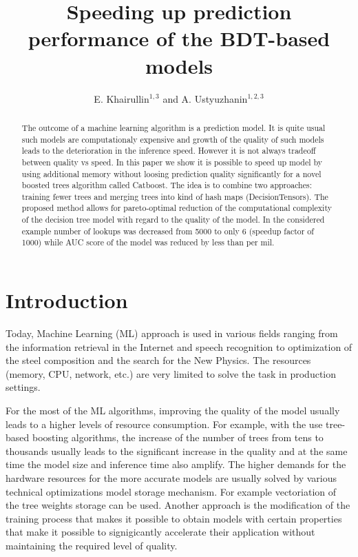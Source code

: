 \documentclass[a4paper]{jpconf}
\begin{document}
\title{Speeding up prediction performance of the BDT-based models}

\author{
 E. Khairullin$^{1, 3}$
 and
 A. Ustyuzhanin$^{1, 2, 3}$
}
\address{$^{1}$ Moscow Institute of Physics and Technology}
\address{$^{2}$ National Research University Higher School of Economics, 20 Myasnitskaya st., Moscow 101000, Russia}
\address{$^{3}$ Yandex School of Data Analysis, 11/2, Timura Frunze st., Moscow 119021, Russia}


\begin{abstract}
The outcome of a machine learning algorithm is a prediction model. It is quite usual such models are computationaly expensive and growth of the quality of such models leads to the deterioration in the inference speed. However it is not always tradeoff between quality vs speed. In this paper we show it is possible to speed up model by using additional memory without loosing prediction quality significantly for a novel boosted trees algorithm called Catboost. The idea is to combine two approaches: training fewer trees and merging trees into kind of hash maps (DecisionTensors). The proposed method allows for pareto-optimal reduction of the computational complexity of the decision tree model with regard to the quality of the model. In the considered example number of lookups was decreased from 5000 to only 6 (speedup factor of 1000) while AUC score of the model was reduced by less than per mil.
\end{abstract}

\section{Introduction}
Today, Machine Learning (ML) approach is used in various fields ranging from the information retrieval in the Internet and speech recognition to optimization of the steel composition and the search for the New Physics.
The resources (memory, CPU, network, etc.) are very limited to solve the task in production settings.

For the most of the ML algorithms, improving the quality of the model usually leads to a higher levels of resource consumption. For example, with the use tree-based boosting algorithms, the increase of the number of trees from tens to thousands usually leads to the significant increase in the quality and at the same time the model size and inference time also amplify. The higher demands for the hardware resources for the more accurate models are usually solved by various technical optimizations model storage mechanism. For example vectoriation of the tree weights storage can be used. Another approach is the modification of the training process that makes it possible to obtain models with certain properties that make it possible to signigicantly accelerate their application without maintaining the required level of quality.
\end{document}
